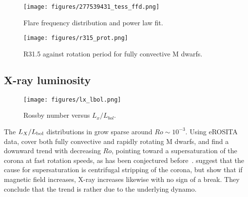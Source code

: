 \documentclass[twocolumn]{aastex631}
\begin{document}
\begin{figure}
    \begin{centering}
        \texttt{[image: figures/277539431\_tess\_ffd.png]}
        \caption{
         Flare frequency distribution and power law fit.
        }
        \label{fig:ffd}
    \end{centering}
\end{figure}


\begin{figure}
    \begin{centering}
        \texttt{[image: figures/r315\_prot.png]}
        \caption{
         R31.5 against rotation period for fully convective M dwarfs.
        }
        \label{fig:r315}
    \end{centering}
\end{figure}


\subsection{X-ray luminosity}
\label{sec:discussion:xraylum}

\begin{figure}[ht!]
    \begin{centering}
        \texttt{[image: figures/lx\_lbol.png]}
        \caption{
         Rossby number versus $L_x/L_{bol}$.
        }
        \label{fig:lxlbol}
    \end{centering}
\end{figure}


The $L_X/L_{\rm bol}$ distributions in \citet{cook2014trends, wright2016solartype} grow sparse around $Ro\sim10^{-3}$. Using eROSITA data, \citet{magaudda2022first} cover both fully convective and rapidly rotating M dwarfs, and find a downward trend with decreasing $Ro$, pointing toward a supersaturation of the corona at fast rotation speeds, as has been conjectured before~\citep{jeffries2011investigating,ramsay2020tess}. \citet{jeffries2011investigating} suggest that the cause for supersaturation is centrifugal stripping of the corona, but \citet{reiners2022magnetism} show that if magnetic field increases, X-ray increases likewise with no sign of a break. They conclude that the trend is rather due to the underlying dynamo.

\cite{brown2023coronal}

\cite{johnstone2012soft}
\end{document}
